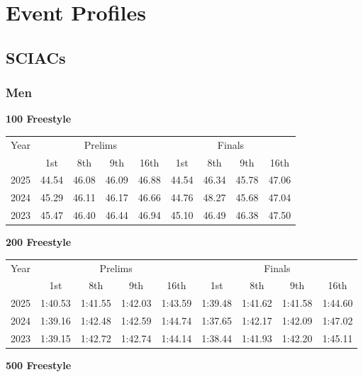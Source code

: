 \clearpage
\section{Event Profiles}

\subsection{SCIACs}

\subsubsection{Men}

\clearpage
\textbf{100 Freestyle}

\begin{flushleft}
\begin{tabular}{|c|c|c|c|c|c|c|c|c|}
\hline
Year & \multicolumn{4}{c|}{Prelims} & \multicolumn{4}{c|}{Finals} \\
\cline{2-9}
& 1st & 8th & 9th & 16th & 1st & 8th & 9th & 16th \\
\hline
2025 & 44.54 & 46.08 & 46.09 & 46.88 & 44.54 & 46.34 & 45.78 & 47.06 \\
2024 & 45.29 & 46.11 & 46.17 & 46.66 & 44.76 & 48.27 & 45.68 & 47.04  \\
2023 & 45.47 & 46.40 & 46.44 & 46.94 & 45.10 & 46.49 & 46.38 & 47.50 \\
\hline
\end{tabular}
\end{flushleft}

\textbf{200 Freestyle}

\begin{flushleft}
\begin{tabular}{|c|c|c|c|c|c|c|c|c|}
\hline
Year & \multicolumn{4}{c|}{Prelims} & \multicolumn{4}{c|}{Finals} \\
\cline{2-9}
& 1st & 8th & 9th & 16th & 1st & 8th & 9th & 16th \\
\hline
2025 & 1:40.53 & 1:41.55 & 1:42.03 & 1:43.59 & 1:39.48 & 1:41.62 & 1:41.58 & 1:44.60 \\
2024 & 1:39.16 & 1:42.48 & 1:42.59 & 1:44.74 & 1:37.65 & 1:42.17 & 1:42.09 & 1:47.02 \\
2023 & 1:39.15 & 1:42.72 & 1:42.74 & 1:44.14 & 1:38.44 & 1:41.93 & 1:42.20 & 1:45.11 \\
\hline
\end{tabular}
\end{flushleft}

\textbf{500 Freestyle}

